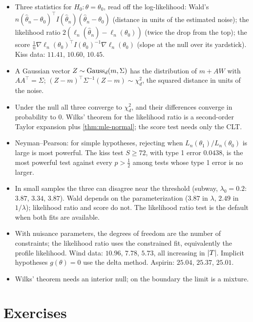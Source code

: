 \begin{itemize}[nosep]
\item Three statistics for $H_0: \theta = \theta_0$, read off the log-likelihood: Wald's $n(\hat{\theta}_n - \theta_0)^\top I(\hat{\theta}_n)(\hat{\theta}_n - \theta_0)$ (distance in units of the estimated noise); the likelihood ratio $2(\ell_n(\hat{\theta}_n) - \ell_n(\theta_0))$ (twice the drop from the top); the score $\frac1n\nabla\ell_n(\theta_0)^\top I(\theta_0)^{-1}\nabla\ell_n(\theta_0)$ (slope at the null over its yardstick). Kiss data: $11.41$, $10.60$, $10.45$.
\item A Gaussian vector $Z \sim \text{Gauss}_d(m, \Sigma)$ has the distribution of $m + AW$ with $AA^\top = \Sigma$; $(Z - m)^\top\Sigma^{-1}(Z - m) \sim \chi^2_d$, the squared distance in units of the noise.
\item Under the null all three converge to $\chi^2_d$, and their differences converge in probability to $0$. Wilks' theorem for the likelihood ratio is a second-order Taylor expansion plus \cref{thm:mle-normal}; the score test needs only the CLT.
\item Neyman--Pearson: for simple hypotheses, rejecting when $L_n(\theta_1)/L_n(\theta_0)$ is large is most powerful. The kiss test $S \geq 72$, with type 1 error $0.0438$, is the most powerful test against every $p > \frac12$ among tests whose type 1 error is no larger.
\item In small samples the three can disagree near the threshold (subway, $\lambda_0 = 0.2$: $3.87$, $3.34$, $3.87$). Wald depends on the parameterization ($3.87$ in $\lambda$, $2.49$ in $1/\lambda$); likelihood ratio and score do not. The likelihood ratio test is the default when both fits are available.
\item With nuisance parameters, the degrees of freedom are the number of constraints; the likelihood ratio uses the constrained fit, equivalently the profile likelihood. Wind data: $10.96$, $7.78$, $5.73$, all increasing in $\lvert T\rvert$. Implicit hypotheses $g(\theta) = 0$ use the delta method. Aspirin: $25.04$, $25.37$, $25.01$.
\item Wilks' theorem needs an interior null; on the boundary the limit is a mixture.
\end{itemize}

\section{Exercises}
\label{sec:wlr-exercises}

